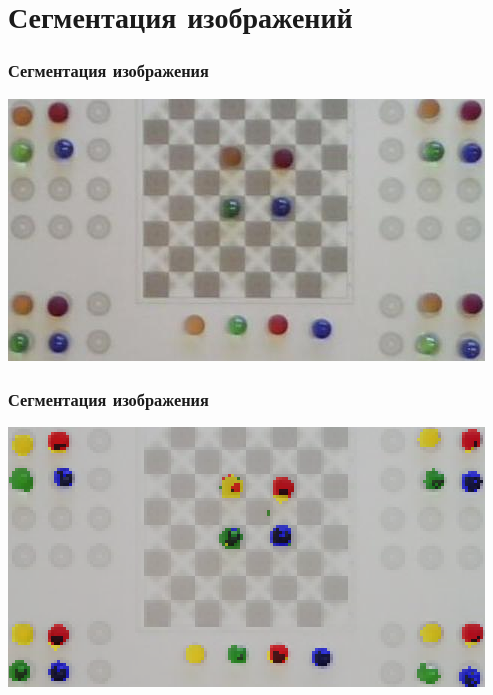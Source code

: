 \documentclass[24pt,pdf,hyperref={unicode},aspectratio=169]{beamer}
\begin{document}
\section{Сегментация изображений}

\begin{frame}\frametitle{Сегментация изображения}
\includegraphics[width=\textwidth]{Images/Checkers-raw.png} 
\end{frame}

\begin{frame}\frametitle{Сегментация изображения}
\includegraphics[width=\textwidth]{Images/Checkers-segmented.png} 
\end{frame}
\end{document}
